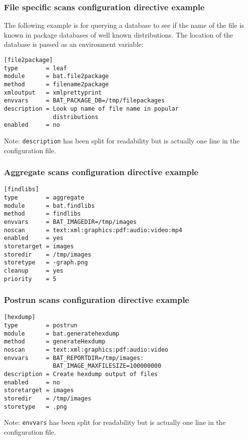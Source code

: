 \documentclass[11pt]{beamer}
\begin{document}
\begin{frame}[fragile]
\frametitle{File specific scans configuration directive example}
The following example is for querying a database to see if the name of the file is known in package databases of well known distributions. The location of the database is passed as an environment variable:

\begin{verbatim}
[file2package]
type        = leaf
module      = bat.file2package
method      = filename2package
xmloutput   = xmlprettyprint
envvars     = BAT_PACKAGE_DB=/tmp/filepackages
description = Look up name of file name in popular
              distributions
enabled     = no
\end{verbatim}
Note: \texttt{description} has been split for readability but is actually one line in the configuration file.
\end{frame}

\begin{frame}[fragile]
\frametitle{Aggregate scans configuration directive example}
\begin{verbatim}
[findlibs]
type        = aggregate
module      = bat.findlibs
method      = findlibs
envvars     = BAT_IMAGEDIR=/tmp/images
noscan      = text:xml:graphics:pdf:audio:video:mp4
enabled     = yes
storetarget = images
storedir    = /tmp/images
storetype   = -graph.png
cleanup     = yes
priority    = 5
\end{verbatim}
\end{frame}

\begin{frame}[fragile]
\frametitle{Postrun scans configuration directive example}
\begin{verbatim}
[hexdump]
type        = postrun
module      = bat.generatehexdump
method      = generateHexdump
noscan      = text:xml:graphics:pdf:audio:video
envvars     = BAT_REPORTDIR=/tmp/images:
              BAT_IMAGE_MAXFILESIZE=100000000
description = Create hexdump output of files
enabled     = no
storetarget = images
storedir    = /tmp/images
storetype   = .png
\end{verbatim}

Note: \texttt{envvars} has been split for readability but is actually one line in the configuration file.
\end{frame}
\end{document}
